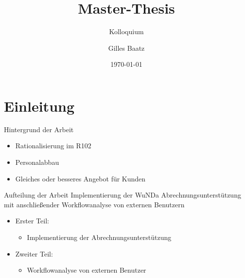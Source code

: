 \documentclass{beamer}
\title %
{Master-Thesis}
\subtitle
{Kolloquium} %
\author{Gilles Baatz}
\institute[htw saar] %
{
  HTW des Saarlandes \newline Cismet
}
\date[Fach] %
{\today}
\begin{document}
\begin{frame}
  \titlepage
\end{frame}







\section{Einleitung}

\begin{frame}{Hintergrund der Arbeit}

  \begin{itemize}
  \item
    Rationalisierung im R102
    \pause
  \item
    Personalabbau
    \pause
  \item
    Gleiches oder besseres Angebot für Kunden
  \end{itemize}
\end{frame}

\begin{frame}{Aufteilung der Arbeit}
Implementierung der WuNDa Abrechnungsunterstützung mit anschließender Workflowanalyse von externen Benutzern  \pause
\bigskip
  \begin{itemize}
  \item
    Erster Teil:
    \begin{itemize}
    \item Implementierung der Abrechnungsunterstützung
    \end{itemize}
    \pause
  \item
    Zweiter Teil:
    \begin{itemize}
    \item Workflowanalyse von externen Benutzer
    \end{itemize}  
  \end{itemize}
\end{frame}
\end{document}
